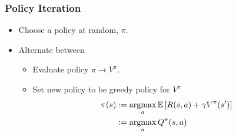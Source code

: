 

\begin{frame}
	\frametitle{Policy Iteration}
	
	\begin{itemize}
		\item<1-> Choose a policy at random, $\pi
		$.
		\item<2-> Alternate between
		\begin{itemize}
			\item<2-> Evaluate policy $\pi \to V^\pi$.
			\item<3-> Set new policy to be greedy policy for $V^\pi$
			\begin{equation*}
			\begin{aligned}
				\pi(s) & := \mathop{\mathrm{argmax}}_a \mathbb{E}\left[R(s,a) + \gamma V^{\pi}(s')\right] \\
						& := \mathop{\mathrm{argmax}}_a Q^{\pi}(s, a)
			\end{aligned}
			\end{equation*}
		\end{itemize}
	\end{itemize}

\end{frame}


